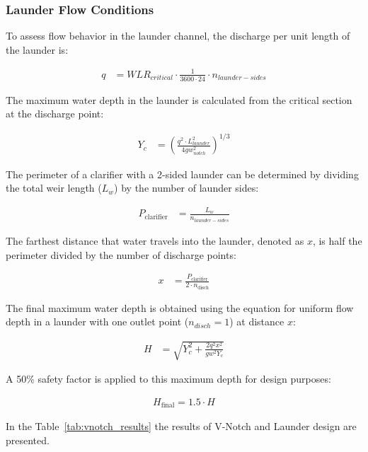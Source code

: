 \documentclass[11pt]{article}
\begin{document}
\subsubsection{Launder Flow Conditions}

To assess flow behavior in the launder channel, the discharge per unit length of the launder is:

\begin{align}
q &= WLR_{critical} \cdot \frac{1}{3600 \cdot 24} \cdot n_{launder-sides}
\end{align}

The maximum water depth in the launder is calculated from the critical section at the discharge point:

\begin{align}
Y_c &= \left( \frac{q^2 \cdot L_{launder}^2}{4 g w_{notch}^2} \right)^{1/3}
\end{align}

The perimeter of a clarifier with a 2-sided launder can be determined by dividing the total weir length ($L_w$) by the number of launder sides:

\begin{align}
P_{\text{clarifier}} &= \frac{L_w}{n_{launder-sides}}
\label{eq:clarifier_perimeter}
\end{align}

The farthest distance that water travels into the launder, denoted as $x$, is half the perimeter divided by the number of discharge points:

\begin{align}
x &= \frac{P_{\text{clarifier}}}{2 \cdot n_{\text{disch}}}
\label{eq:launder_travel_distance}
\end{align}

The final maximum water depth is obtained using the equation for uniform flow 
depth in a launder with one outlet point ($n_{disch}=1$) at distance \( x \):




\begin{align}
H &= \sqrt{Y_c^2 + \frac{2 q^2 x^2}{g w^2 Y_c}}
\label{eq:maximum_water_depth}
\end{align}

A 50\% safety factor is applied to this maximum depth for design purposes:

\begin{align}
H_{\text{final}} = 1.5 \cdot H
\end{align}


In the Table~\ref{tab:vnotch_results} the results of V-Notch and Launder design are presented.
\end{document}
